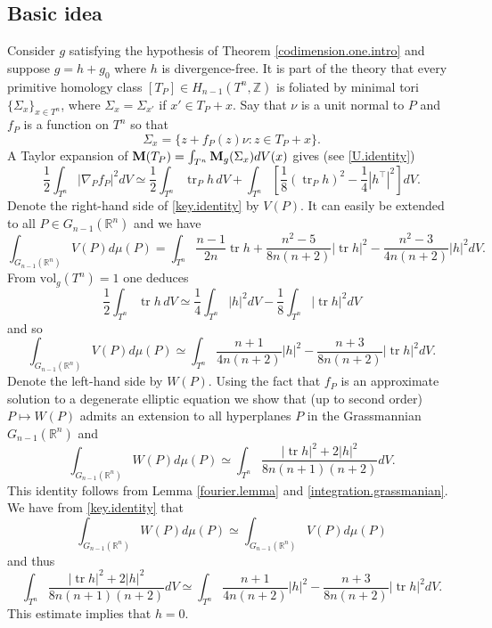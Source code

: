 \documentclass[11pt]{amsart}
\def\R{\mathbb R}
\def\Z{\mathbb Z}
\def\tr{\operatorname{tr}}
\def\vol{\mathrm{vol}}
\theoremstyle{remark}
\theoremstyle{definition}
\begin{document}
	\subsection{Basic idea}\label{basic.idea.codimension.one} Consider $g$ satisfying the hypothesis of Theorem \ref{codimension.one.intro} and suppose $g=h+g_0$ where $h$ is divergence-free. It is part of the theory \cite[Theorem 5.1]{cgn} that  every  primitive homology class $[T_P]\in H_{n-1}(T^n,\Z)$ is foliated by minimal tori $\{\Sigma_x\}_{x\in T^n}$, where $\Sigma_x=\Sigma_{x'}$ if $x'\in T_P+x$. Say that $\nu$ is a unit normal to $P$ and $f_P$ is a function on $T^n$ so that 
	$$\Sigma_x=\{z+f_P(z)\nu: z \in T_P+x\}.$$
	A Taylor expansion of ${\bf M}(T_P)=\int_{T^n}{\bf M}_{g}(\Sigma_x)dV(x)$ gives (see \eqref{U.identity})
	\begin{equation}\label{key.identity}
		\frac12\int_{T^n}|\nabla_P f_P|^2dV\simeq \frac12\int_{T^n}\tr _{P} h\,dV+\int_{T^n}\left[\frac18(\tr _{P}h)^2-\frac14|h^\top|^2\right]dV.
	\end{equation}
	{Denote the  right-hand side of \eqref{key.identity} by $V(P)$.} It  can easily be extended to all  $P\in G_{n-1}(\R^n)$ and we have
	$$\int_{G_{n-1}(\R^n)}V(P)d\mu(P)=\int_{T^n}\frac{n-1}{2n}\tr h+\frac{n^2-5}{8n(n+2)}|\tr h|^2-\frac{n^2-3}{4n(n+2)}|h|^2dV.$$
	From $\vol_g(T^n)=1$ one deduces
	$$\frac12\int_{T^n}\tr h\,dV\simeq\frac14\int_{T^n}|h|^2dV-\frac18\int_{T^n}|\tr h|^2dV$$
	and so
	$$\int_{G_{n-1}(\R^n)}V(P)d\mu(P)\simeq\int_{T^n}\frac{n+1}{4n(n+2)}|h|^2-\frac{n+3}{8n(n+2)}|\tr h|^2dV.$$
	Denote the left-hand side by $W(P)$. {Using  the fact that $f_P$ is an approximate solution to a degenerate elliptic equation} we show that  (up to second order) $P\mapsto W(P)$ admits an extension to all hyperplanes $P$ in the Grassmannian $G_{n-1}(\R^n)$ and
	$$\int_{G_{n-1}(\R^n)}W(P)d\mu(P)\simeq \int_{T^n}\frac{|\tr h|^2+2|h|^2}{8n(n+1)(n+2)}dV.$$
	This identity  follows from Lemma \ref{fourier.lemma} and \eqref{integration.grassmanian}. We have from \eqref{key.identity} that
	$$\int_{G_{n-1}(\R^n)}W(P)d\mu(P)\simeq\int_{G_{n-1}(\R^n)}V(P)d\mu(P)$$
	and thus
	$$\int_{T^n}\frac{|\tr h|^2+2|h|^2}{8n(n+1)(n+2)}dV\simeq \int_{T^n}\frac{n+1}{4n(n+2)}|h|^2-\frac{n+3}{8n(n+2)}|\tr h|^2dV.$$
	This estimate implies that $h=0$.
	
\end{document}
